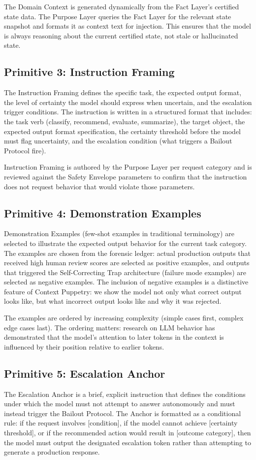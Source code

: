 \documentclass[12pt]{article}
\begin{document}
The Domain Context is generated dynamically from the Fact Layer's certified state data. The Purpose Layer queries the Fact Layer for the relevant state snapshot and formats it as context text for injection. This ensures that the model is always reasoning about the current certified state, not stale or hallucinated state.

\subsection{Primitive 3: Instruction Framing}
The Instruction Framing defines the specific task, the expected output format, the level of certainty the model should express when uncertain, and the escalation trigger conditions. The instruction is written in a structured format that includes: the task verb (classify, recommend, evaluate, summarize), the target object, the expected output format specification, the certainty threshold before the model must flag uncertainty, and the escalation condition (what triggers a Bailout Protocol fire).

Instruction Framing is authored by the Purpose Layer per request category and is reviewed against the Safety Envelope parameters to confirm that the instruction does not request behavior that would violate those parameters.

\subsection{Primitive 4: Demonstration Examples}
Demonstration Examples (few-shot examples in traditional terminology) are selected to illustrate the expected output behavior for the current task category. The examples are chosen from the forensic ledger: actual production outputs that received high human review scores are selected as positive examples, and outputs that triggered the Self-Correcting Trap architecture (failure mode examples) are selected as negative examples. The inclusion of negative examples is a distinctive feature of Context Puppetry: we show the model not only what correct output looks like, but what incorrect output looks like and why it was rejected.

The examples are ordered by increasing complexity (simple cases first, complex edge cases last). The ordering matters: research on LLM behavior has demonstrated that the model's attention to later tokens in the context is influenced by their position relative to earlier tokens.

\subsection{Primitive 5: Escalation Anchor}
The Escalation Anchor is a brief, explicit instruction that defines the conditions under which the model must not attempt to answer autonomously and must instead trigger the Bailout Protocol. The Anchor is formatted as a conditional rule: if the request involves [condition], if the model cannot achieve [certainty threshold], or if the recommended action would result in [outcome category], then the model must output the designated escalation token rather than attempting to generate a production response.
\end{document}
